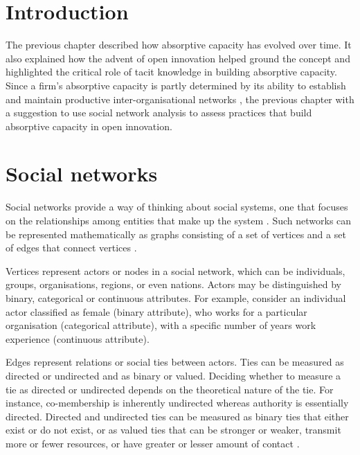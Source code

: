 
\section{Introduction}

The previous chapter described how absorptive capacity has evolved over time. It also explained how the advent of open innovation helped ground the concept and highlighted the critical role of tacit knowledge in building absorptive capacity. Since a firm's absorptive capacity is partly determined by its ability to establish and maintain productive inter-organisational networks \citep{inkpen2005social}, the previous chapter with a suggestion to use social network analysis to assess practices that build absorptive capacity in open innovation. \medskip

\section{Social networks}

Social networks provide a way of thinking about social systems, one that focuses on the relationships among entities that make up the system \citep{borgatti2013analyzing,robins2015doing}. Such networks can be represented mathematically as graphs consisting of a set of vertices and a set of edges that connect vertices \citep{newman2010networks}. \medskip

Vertices represent actors or nodes in a social network, which can be individuals, groups, organisations, regions, or even nations. Actors may be distinguished by binary, categorical or continuous attributes. For example, consider an individual actor classified as female (binary attribute), who works for a particular organisation (categorical attribute), with a specific number of years work experience (continuous attribute). \medskip

Edges represent relations or social ties between actors. Ties can be measured as directed or undirected and as binary or valued. Deciding whether to measure a tie as directed or undirected depends on the theoretical nature of the tie. For instance, co-membership is inherently undirected whereas authority is essentially directed. Directed and undirected ties can be measured as binary ties that either exist or do not exist, or as valued ties that can be stronger or weaker, transmit more or fewer resources, or have greater or lesser amount of contact \citep{scott2011sage}.\medskip

